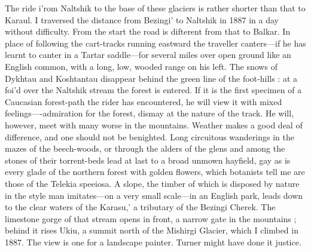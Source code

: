 \documentclass{article}
\begin{document}
	The ride i'rom Naltshik to the base of these glaciers is rather shorter than that to Karaul. I traversed the distance from Bezingi' to Naltshik in 1887 in a day without difficulty. From the start the road is difterent from that to Balkar. In place of following the cart-tracks running eastward the traveller canters—if he has learnt to canter in a Tartar saddle—for several miles over open ground like an English common, with a long, low, wooded range on his left. The snows of Dykhtau and Koshtantau disappear behind the green line of the foot-hills : at a foi'd over the Naltshik stream the forest is entered. If it is the first specimen of a Caucasian forest-path the rider has encountered, he will view it with mixed feelings—-admiration for the forest, dismay at the nature of the track. He will, however, meet with many worse in the mountains. Weather makes a good deal of difference, and one should not be benighted. Long circuitous wanderings in the mazes of the beech-woods, or through the alders of the glens and among the stones of their torrent-beds lead at last to a broad unmown hayfield, gay as is every glade of the northern forest with golden flowers, which botanists tell me are those of the Telekia speeiosa. A slope, the timber of which is disposed by nature in the style man imitates—on a very small scale—in an English park, leads down to the clear waters of the Karasu,' a tributary of the Bezingi Cherek. The limestone gorge of that stream opens in front, a narrow gate in the mountains ; behind it rises Ukiu, a summit north of the Mishirgi Glacier, which I climbed in 1887. The view is one for a landscape painter. Turner might have done it justice.
	
\end{document}
